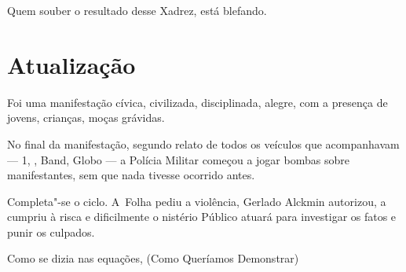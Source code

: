 Quem souber o resultado desse Xadrez, está blefando.

\section{Atualização}

Foi uma manifestação cívica, civilizada, disciplinada, alegre, com a
presença de jovens, crianças, moças grávidas.

No final da manifestação, segundo relato de todos os veículos que
acompanhavam --- 1, , Band, Globo --- a Polícia Militar começou a
jogar bombas sobre manifestantes, sem que nada tivesse ocorrido antes.

Completa"-se o ciclo. A~Folha pediu a violência, Gerlado Alckmin
autorizou, a  cumpriu à risca e dificilmente o nistério Público
atuará para investigar os fatos e punir os culpados.

Como se dizia nas equações,  (Como Queríamos Demonstrar)

 

 
